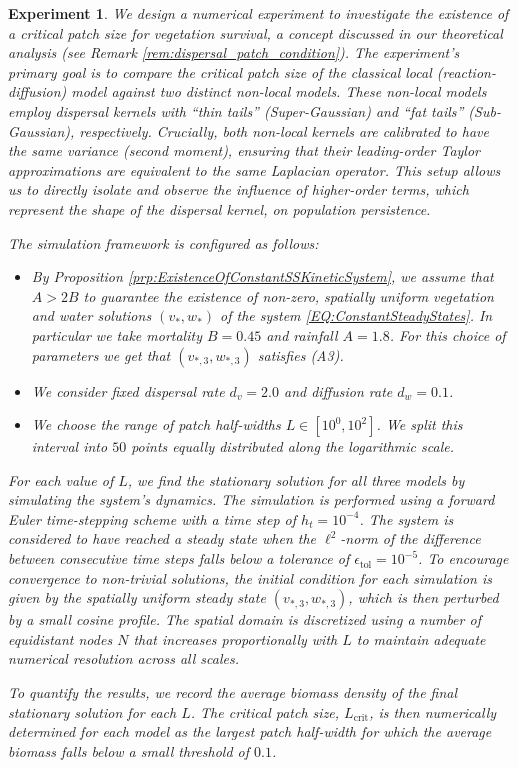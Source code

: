 \documentclass[11pt, a4paper]{article}
\theoremstyle{break}
\theoremstyle{break}
\theoremstyle{break}
\theoremstyle{break}
\theoremstyle{break}
\theoremstyle{break}
\theoremstyle{break}
\theoremstyle{break}
\newtheorem{expe}{Experiment}[section]
\theoremstyle{break}
\begin{document}
\begin{expe}
    We design a numerical experiment to investigate the existence of a critical patch size for vegetation survival, a concept discussed in our theoretical analysis (see Remark \ref{rem:dispersal_patch_condition}). The experiment's primary goal is to compare the critical patch size of the classical local (reaction-diffusion) model against two distinct non-local models. These non-local models employ dispersal kernels with ``thin tails'' (Super-Gaussian) and ``fat tails'' (Sub-Gaussian), respectively. Crucially, both non-local kernels are calibrated to have the same variance (second moment), ensuring that their leading-order Taylor approximations are equivalent to the same Laplacian operator. This setup allows us to directly isolate and observe the influence of higher-order terms, which represent the shape of the dispersal kernel, on population persistence.
    
    The simulation framework is configured as follows:
    \begin{itemize}
        \item By Proposition \ref{prp:ExistenceOfConstantSSKineticSystem}, we assume that $A > 2B$ to guarantee the existence of non-zero, spatially uniform vegetation and water solutions $(v_*, w_*)$ of the system \eqref{EQ:ConstantSteadyStates}. In particular we take mortality $B = 0.45$ and rainfall $A = 1.8$. For this choice of parameters we get that $(v_{*, 3}, w_{*, 3})$ satisfies (A3).
        \item We consider fixed dispersal rate $d_v = 2.0$ and diffusion rate $d_w = 0.1$.
        \item We choose the range of patch half-widths $L \in [10^{0}, 10^2]$. We split this interval into $50$ points equally distributed along the logarithmic scale.
    \end{itemize}
    For each value of $L$, we find the stationary solution for all three models by simulating the system's dynamics. The simulation is performed using a forward Euler time-stepping scheme with a time step of $h_t = 10^{-4}$. The system is considered to have reached a steady state when the $\ell^2$-norm of the difference between consecutive time steps falls below a tolerance of $\epsilon_{\text{tol}} = 10^{-5}$. To encourage convergence to non-trivial solutions, the initial condition for each simulation is given by the spatially uniform steady state $(v_{*,3}, w_{*,3})$, which is then perturbed by a small cosine profile. The spatial domain is discretized using a number of equidistant nodes $N$ that increases proportionally with $L$ to maintain adequate numerical resolution across all scales.

    To quantify the results, we record the average biomass density of the final stationary solution for each $L$. The critical patch size, $L_{\text{crit}}$, is then numerically determined for each model as the largest patch half-width for which the average biomass falls below a small threshold of $0.1$.
\end{expe}
\end{document}
